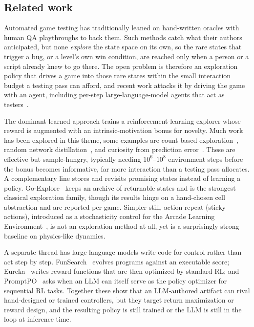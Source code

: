 \documentclass{article}
\begin{document}
\subsection{Related work}
\label{sec:related}
Automated game testing has traditionally leaned on hand-written oracles with human QA playthroughs to back them. Such methods catch what their authors anticipated, but none
\emph{explore} the state space on its own, so the rare states that trigger a bug, or a level's own win condition, are
reached only when a person or a script already knew to go there. The open problem is therefore an exploration policy that
drives a game into those rare states within the small interaction budget a testing pass can afford, and recent work
attacks it by driving the game with an agent, including per-step large-language-model agents that act as
testers~\citep{titan}.

The dominant learned approach trains a reinforcement-learning explorer whose reward is augmented with an
intrinsic-motivation bonus for novelty. Much work has been explored in this theme, some examples are count-based exploration~\citep{tang2017}, random network
distillation~\citep{rnd}, and curiosity from prediction error~\citep{icm}. These are effective but sample-hungry,
typically needing $10^6$--$10^8$ environment steps before the bonus becomes informative, far more interaction than a
testing pass allocates. A complementary line stores and revisits promising states instead of learning a policy.
Go-Explore~\citep{goexplore} keeps an archive of returnable states and is the strongest classical exploration family,
though its results hinge on a hand-chosen cell abstraction and are reported per game. Simpler still, action-repeat
(sticky actions), introduced as a stochasticity control for the Arcade Learning Environment~\citep{machado2018}, is not
an exploration method at all, yet is a surprisingly strong baseline on physics-like dynamics.

A separate thread has large language models write code for control rather than act step by step.
FunSearch~\citep{funsearch} evolves programs against an executable score; Eureka~\citep{eureka} writes reward functions
that are then optimized by standard RL; and PromptPO~\citep{promptpo} asks when an LLM can itself serve as the policy
optimizer for sequential RL tasks. Together these show that an LLM-authored artifact can rival hand-designed or trained
controllers, but they target return maximization or reward design, and the resulting policy is still trained or the LLM
is still in the loop at inference time.
\end{document}
